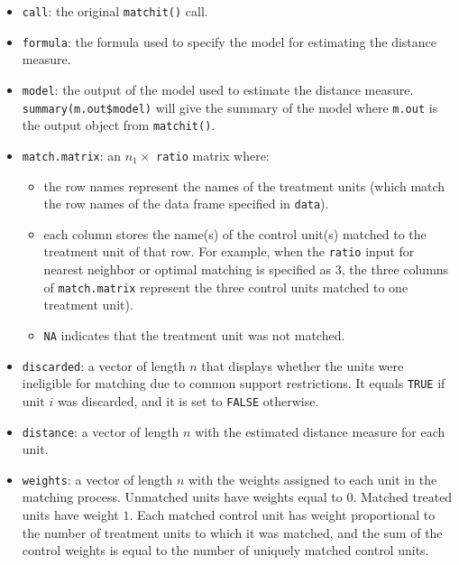 \begin{itemize}
\item \texttt{call}: the original {\tt matchit()} call.
  
\item \texttt{formula}: the formula used to specify the model for
  estimating the distance measure.
  
\item \texttt{model}: the output of the model used to estimate
  the distance measure.  \texttt{summary(m.out\$model)} will give the
  summary of the model where \texttt{m.out} is the output object from
  \texttt{matchit()}.
  
\item \texttt{match.matrix}: an $n_1 \times$ \texttt{ratio} matrix
  where:
  \begin{itemize}
  \item the row names represent the names of the
    treatment units (which match the row names of the data frame specified in
    \texttt{data}).  
  \item each column stores the name(s) of the control unit(s) matched
    to the treatment unit of that row. For example, when the
    \texttt{ratio} input for nearest neighbor or optimal matching is
    specified as 3, the three columns of \texttt{match.matrix}
    represent the three control units matched to one treatment unit).
  \item \texttt{NA} indicates that the treatment unit was not matched.
  \end{itemize}

\item \texttt{discarded}: a vector of length $n$ that displays
  whether the units were ineligible for matching due to common support
  restrictions.  It equals \texttt{TRUE} if unit $i$ was discarded,
  and it is set to \texttt{FALSE} otherwise.
  
\item \texttt{distance}: a vector of length $n$ with the estimated
  distance measure for each unit.
  
\item \texttt{weights}: a vector of length $n$ with the
  weights assigned to each unit in the matching process.  Unmatched
  units have weights equal to $0$. Matched treated units have weight
  $1$.  Each matched control unit has weight proportional to the
  number of treatment units to which it was matched, and the sum of
  the control weights is equal to the number of uniquely matched
  control units. 
 

\end{itemize}
